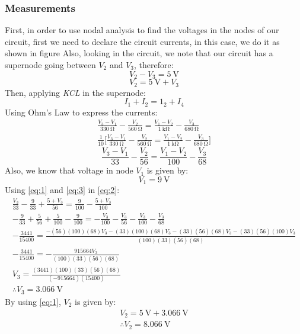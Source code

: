 \documentclass[letterpaper]{article}
\begin{document}
\subsubsection{Measurements}
First, in order to use nodal analysis to find the voltages in the nodes of our circuit, first we
need to declare the circuit currents, in this case, we do it as shown in figure %
Also, looking in the circuit, we note that our circuit has a supernode going between $V_2$ and
$V_3$, therefore:
\[V_2-V_3=\SI{5}{\volt}\]
\begin{equation}
    V_2 = \SI{5}{\volt}+V_3
    \label{eq:1}
\end{equation}
Then, applying \textit{KCL} in the supernode:
\[I_1+I_2=1_2+I_4\]
Using Ohm's Law to express the currents:
\begin{gather*}
    \frac{V_3-V_1}{\SI{330}{\ohm}}-\frac{V_2}{\SI{560}{\ohm}}=\frac{V_1-V_2}{\SI{1}{\kilo\ohm}}-\frac{V_3}{\SI{680}{\ohm}}\\
    \frac{1}{10}\Bigg[\frac{V_3-V_1}{\SI{330}{\ohm}}-\frac{V_2}{\SI{560}{\ohm}}=\frac{V_1-V_2}{\SI{1}{\kilo\ohm}}-\frac{V_3}{\SI{680}{\ohm}}\Bigg]
\end{gather*}
\begin{equation}
    \frac{V_3-V_1}{33}-\frac{V_2}{56}=\frac{V_1-V_2}{100}-\frac{V_3}{68}
    \label{eq:2}
\end{equation}
Also, we know that voltage in node $V_1$ is given by:
\begin{equation}
    V_1=\SI{9}{\volt}
    \label{eq:3}
\end{equation}
Using \eqref{eq:1} and \eqref{eq:3} in \eqref{eq:2}:
\begin{gather*}
    \frac{V_3}{33}-\frac{9}{33}+\frac{5+V_3}{56}=\frac{9}{100}-\frac{5+V_3}{100}\\
    -\frac{9}{33}+\frac{5}{56}+\frac{5}{100}-\frac{9}{100}=-\frac{V_3}{100}-\frac{V_3}{56}-\frac{V_3}{100}-\frac{V_3}{68}\\
    -\frac{3441}{15400}=\frac{-(56)(100)(68)V_3-(33)(100)(68)V_3-(33)(56)(68)V_3-(33)(56)(100)V_3}{(100)(33)(56)(68)}\\
    -\frac{3441}{15400}=-\frac{915664V_3}{(100)(33)(56)(68)}\\
    V_3=\frac{(3441)(100)(33)(56)(68)}{(-915664)(15400)}\\
    \therefore V_3=\SI{3.066}{\volt}
\end{gather*}
By using \eqref{eq:1}, $V_2$ is given by:
\begin{gather*}
    V_2=\SI{5}{\volt}+\SI{3.066}{\volt}\\
    \therefore V_2 = \SI{8.066}{\volt}
\end{gather*}
\end{document}
